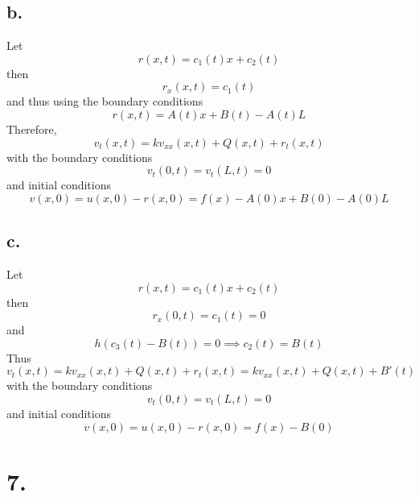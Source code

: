 \documentclass[11pt]{article}
\theoremstyle{mystyle}
\theoremstyle{definition}
\begin{document}
\subsection*{b.}
Let 
\[
  r(x,t) = c_1(t)x + c_2(t)
\]
then 
\[
  r_x(x,t) = c_1(t)
\]
and thus using the boundary conditions
\[
  r(x,t) = A(t) x + B(t) - A(t) L
\]
Therefore, 
\[
  v_t(x,t) = kv_{xx}(x,t) + Q(x,t) + r_t(x,t)
\]
with the boundary conditions 
\[
  v_t(0,t) = v_t(L,t) = 0 
\]
and initial conditions 
\[
  v(x,0) = u(x,0) - r(x,0) = f(x) - A(0) x + B(0) - A(0)L
\]
\subsection*{c.}
Let 
\[
  r(x,t) = c_1(t)x  + c_2(t)
\]
then 
\[
  r_x(0,t) = c_1(t) = 0 
\]
and 
\[
  h(c_3(t) - B(t)) = 0 \implies c_2(t) = B(t) 
\]
Thus 
\[
  v_t(x,t) = kv_{xx}(x,t) + Q(x,t) + r_t(x,t)  = kv_{xx}(x,t) + Q(x,t) + B'(t)
\]
with the boundary conditions 
\[
  v_t(0,t) = v_t(L,t) = 0 
\]
and initial conditions 
\[
  v(x,0) = u(x,0) - r(x,0) = f(x) - B(0)
\]
\newpage
\section*{7.}
\end{document}
